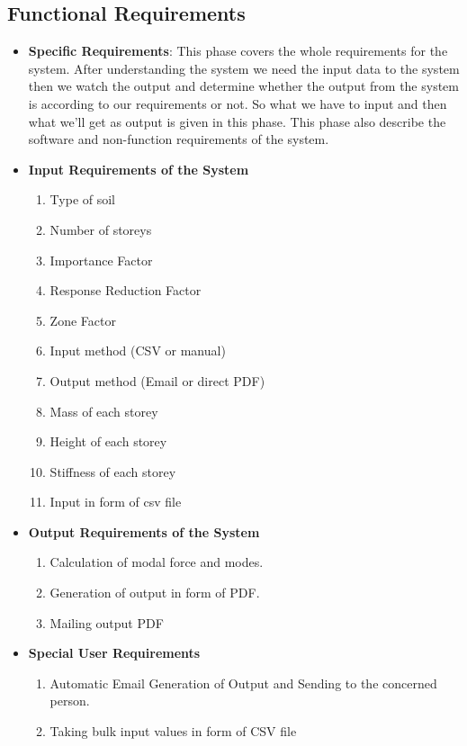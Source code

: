 \subsection{Functional Requirements}
\begin{itemize}
	\item {\bf Specific Requirements}: This phase covers the whole requirements 
	for the system. After understanding the system we need the input data 
	to the system then we watch the output and determine whether the output 
	from the system is according to our requirements or not. So what we have 
	to input and then what we’ll get as output is given in this phase. This 
	phase also describe the software and non-function requirements of the 
	system.
	\item {\bf Input Requirements of the System}
	\begin{enumerate} 
		\item Type of soil
		\item Number of storeys
		\item Importance Factor
		\item Response Reduction Factor
		\item Zone Factor
		\item Input method (CSV or manual)
		\item Output method (Email or direct PDF)
		\item Mass of each storey
		\item Height of each storey
		\item Stiffness of each storey
		\item Input in form of csv file
	\end{enumerate}
	\vskip 0.5cm
	\item {\bf Output Requirements of the System}
	\begin{enumerate} 
		\item Calculation of modal force and modes.
		\item Generation of output in form of PDF.
		\item Mailing output PDF 
	\end{enumerate}
	\vskip 0.5cm
	\item {\bf Special User Requirements}
	\begin{enumerate} 
		\item Automatic Email Generation of Output and Sending to the concerned person.
		\item Taking bulk input values in form of CSV file
	\end{enumerate}

\end{itemize}
